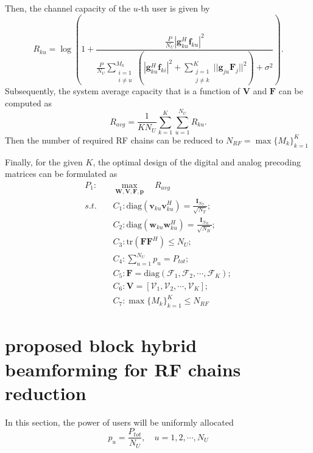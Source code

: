 \documentclass[conference]{IEEEtran}
\begin{document}
Then, the channel capacity of the $u$-th user is given by
\begin{equation}\label{eq:convenR}
R_{ku} = \log\left(1+\frac{\frac{P}{N_U}|{\bm{g}}_{ku}^H \bm{f}_{ku}|^2}{\frac{P}{N_U}\sum\limits_{\substack{i=1 \\ i\neq u}}^{M_k}(|{\bm{g}}_{ku}^H\bm{f}_{ki}|^2+\sum\limits_{\substack{j=1\\j\neq k}}^{K}||\bm{g}_{ju}\bm{F}_j||^2)+\sigma^2}\right).
\end{equation}
Subsequently, the system average capacity that is a function of ${\bm V}$ and ${\bm F}$ can be computed as
\begin{equation}
R_{avg}=\frac{1}{KN_U}\sum_{k=1}^{K}\sum_{u=1}^{N_U}R_{ku}.
\end{equation}
Then the number of required RF chains can be reduced to $N_{RF} = \max \{M_k\}_{k=1}^K $

Finally, for the given $K$, the optimal design of the digital and analog precoding matrices can be formulated as
\begin{align}\label{eq:maxsumrate}
P_1: \quad&\max_{\bm W, \bm V,\bm F, \bm{p}}\quad R_{avg}\\ \nonumber
s.t. \quad&C_1: \text{diag}(\bm{v}_{ku}\bm{v}_{ku}^H)=\frac{\bm{I}_{N_T}}{\sqrt{N_T}};\\
&C_2: \text{diag}(\bm{w}_{ku}\bm{w}_{ku}^H)=\frac{\bm{I}_{N_{R}}}{\sqrt{N_R}};\nonumber\\
&C_3: \text{tr}(\bm{FF}^H) \leq N_U;\nonumber\\
& C_4: \sum_{u=1}^{N_U} p_u = P_{tot};\nonumber\\
&C_5: \bm{F} = \text{diag}(\bm{\mathcal{F}}_1, \bm{\mathcal{F}}_2, \cdots, \bm{\mathcal{F}}_{K});\nonumber\\
&C_6: \bm{V} = [\bm{\mathcal{V}}_1, \bm{\mathcal{V}}_2, \cdots, \bm{\mathcal{V}}_K];\nonumber\\
&C_7: \max \{M_k\}_{k=1}^K \leq N_{RF}\nonumber
\end{align}




\section{proposed block hybrid beamforming for RF chains reduction}
In this section, the power of users will be uniformly allocated
\begin{equation}
p_u = \frac{P_{tot}}{N_U}, \quad u = 1,2,\cdots, N_U
\end{equation}
\end{document}
